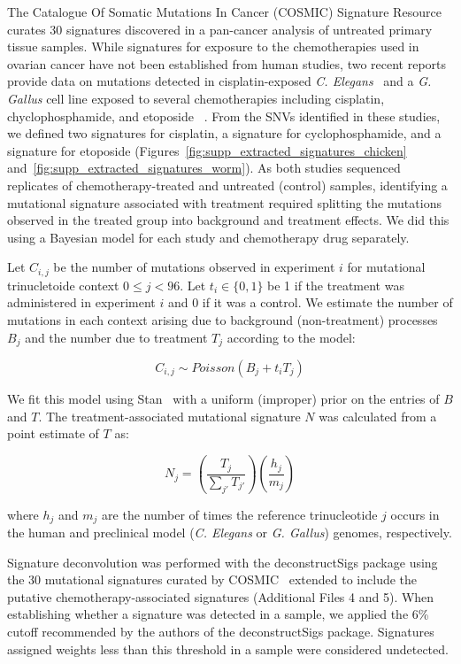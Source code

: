 The Catalogue Of Somatic Mutations In Cancer (COSMIC) Signature Resource curates 30 signatures discovered in a pan-cancer analysis of untreated primary tissue samples. While signatures for exposure to the chemotherapies used in ovarian cancer have not been established from human studies, two recent reports provide data on mutations detected in cisplatin-exposed \textit{C. Elegans}~\cite{Meier_2014} and a \textit{G. Gallus} cell line exposed to several chemotherapies including cisplatin, chyclophosphamide, and etoposide ~\cite{Szikriszt_2016}. From the SNVs identified in these studies, we defined two signatures for cisplatin, a signature for cyclophosphamide, and a signature for etoposide (Figures~\ref{fig:supp_extracted_signatures_chicken} and~\ref{fig:supp_extracted_signatures_worm}). As both studies sequenced replicates of chemotherapy-treated and untreated (control) samples, identifying a mutational signature associated with treatment required splitting the mutations observed in the treated group into background and treatment effects. We did this using a Bayesian model for each study and chemotherapy drug separately.

Let $C_{i,j}$ be the number of mutations observed in experiment $i$ for mutational trinucletoide context $0 \leq j < 96$. Let $t_i \in \{0,1\}$ be 1 if the treatment was administered in experiment $i$ and 0 if it was a control. We estimate the number of mutations in each context arising due to background (non-treatment) processes $B_j$ and the number due to treatment $T_j$ according to the model:

\[
C_{i,j} \sim \mathit{Poisson}(B_j + t_i T_j)
\]

We fit this model using Stan~\cite{Gelman_2015} with a uniform (improper) prior on the entries of $B$ and $T$. The treatment-associated mutational signature $N$ was calculated from a point estimate of $T$ as:

\[
N_j = \left ( \frac{T_j}{\sum_{j'}{T_{j'}}} \right ) \left ( \frac{h_j}{m_j} \right )
\]

where $h_j$ and $m_j$ are the number of times the reference trinucleotide $j$ occurs in the human and preclinical model (\textit{C. Elegans} or \textit{G. Gallus}) genomes, respectively.


Signature deconvolution was performed with the deconstructSigs\cite{Rosenthal_2016} package using the 30 mutational signatures curated by COSMIC~\cite{364242} extended to include the putative chemotherapy-associated signatures (Additional Files 4 and 5). When establishing whether a signature was detected in a sample, we applied the 6\% cutoff recommended by the authors of the deconstructSigs package. Signatures assigned weights less than this threshold in a sample were considered undetected.

